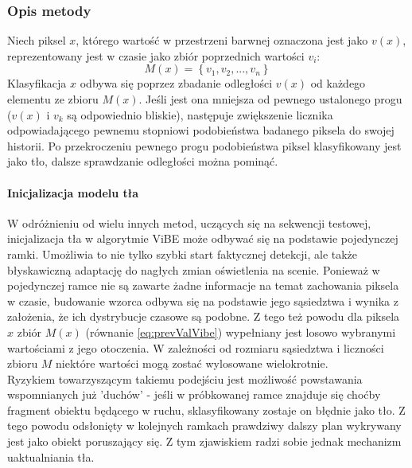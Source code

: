 \subsubsection{Opis metody}
Niech piksel $x$, którego wartość w przestrzeni barwnej oznaczona jest jako $v(x)$, reprezentowany jest w czasie jako zbiór poprzednich wartości $v_{i}$:
\begin{equation}
\label{eq:prevValVibe}
M(x) = \left\{v_{1}, v_{2}, ..., v_{n}\right\}
\end{equation}
Klasyfikacja $x$ odbywa się poprzez zbadanie odległości $v(x)$ od każdego elementu ze zbioru $M(x)$. Jeśli jest ona mniejsza od pewnego ustalonego progu ($v(x)$ i $v_{k}$ są odpowiednio bliskie), następuje zwiększenie licznika odpowiadającego pewnemu stopniowi podobieństwa badanego piksela do swojej historii. Po przekroczeniu pewnego progu podobieństwa piksel klasyfikowany jest jako tło, dalsze sprawdzanie odległości można pominąć.
\paragraph{Inicjalizacja modelu tła \\}
W odróżnieniu od wielu innych metod, uczących się na sekwencji testowej, inicjalizacja tła w algorytmie ViBE może odbywać się na podstawie pojedynczej ramki. Umożliwia to nie tylko szybki start faktycznej detekcji, ale także błyskawiczną adaptację do nagłych zmian oświetlenia na scenie. Ponieważ w pojedynczej ramce nie są zawarte żadne informacje na temat zachowania piksela w czasie, budowanie wzorca odbywa się na podstawie jego sąsiedztwa i wynika z założenia, że ich dystrybucje czasowe są podobne. Z tego też powodu dla piksela $x$ zbiór $M(x)$ (równanie \ref{eq:prevValVibe}) wypełniany jest losowo wybranymi wartościami z jego otoczenia. W zależności od rozmiaru sąsiedztwa i liczności zbioru $M$ niektóre wartości mogą zostać wylosowane wielokrotnie.\\
Ryzykiem towarzyszącym takiemu podejściu jest możliwość powstawania wspomnianych już 'duchów' - jeśli w próbkowanej ramce znajduje się choćby fragment obiektu będącego w ruchu, sklasyfikowany zostaje on błędnie jako tło. Z tego powodu odsłonięty w kolejnych ramkach prawdziwy dalszy plan wykrywany jest jako obiekt poruszający się. Z tym zjawiskiem radzi sobie jednak mechanizm uaktualniania tła.
